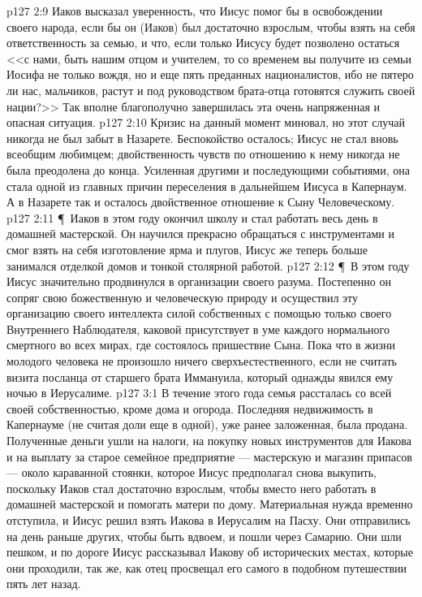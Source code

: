 \vs p127 2:9 Иаков высказал уверенность, что Иисус помог бы в освобождении своего народа, если бы он (Иаков) был достаточно взрослым, чтобы взять на себя ответственность за семью, и что, если только Иисусу будет позволено остаться <<с нами, быть нашим отцом и учителем, то со временем вы получите из семьи Иосифа не только вождя, но и еще пять преданных националистов, ибо не пятеро ли нас, мальчиков, растут и под руководством брата\hyp{}отца готовятся служить своей нации?>> Так вполне благополучно завершилась эта очень напряженная и опасная ситуация.
\vs p127 2:10 Кризис на данный момент миновал, но этот случай никогда не был забыт в Назарете. Беспокойство осталось; Иисус не стал вновь всеобщим любимцем; двойственность чувств по отношению к нему никогда не была преодолена до конца. Усиленная другими и последующими событиями, она стала одной из главных причин переселения в дальнейшем Иисуса в Капернаум. А в Назарете так и осталось двойственное отношение к Сыну Человеческому.
\vs p127 2:11 \P\ Иаков в этом году окончил школу и стал работать весь день в домашней мастерской. Он научился прекрасно обращаться с инструментами и смог взять на себя изготовление ярма и плугов, Иисус же теперь больше занимался отделкой домов и тонкой столярной работой.
\vs p127 2:12 \P\ В этом году Иисус значительно продвинулся в организации своего разума. Постепенно он сопряг свою божественную и человеческую природу и осуществил эту организацию своего интеллекта силой собственных  с помощью только своего Внутреннего Наблюдателя, каковой присутствует в уме каждого нормального смертного во всех мирах, где состоялось пришествие Сына. Пока что в жизни молодого человека не произошло ничего сверхъестественного, если не считать визита посланца от старшего брата Иммануила, который однажды явился ему ночью в Иерусалиме.
\vs p127 3:1 В течение этого года семья рассталась со всей своей собственностью, кроме дома и огорода. Последняя недвижимость в Капернауме (не считая доли еще в одной), уже ранее заложенная, была продана. Полученные деньги ушли на налоги, на покупку новых инструментов для Иакова и на выплату за старое семейное предприятие --- мастерскую и магазин припасов --- около караванной стоянки, которое Иисус предполагал снова выкупить, поскольку Иаков стал достаточно взрослым, чтобы вместо него работать в домашней мастерской и помогать матери по дому. Материальная нужда временно отступила, и Иисус решил взять Иакова в Иерусалим на Пасху. Они отправились на день раньше других, чтобы быть вдвоем, и пошли через Самарию. Они шли пешком, и по дороге Иисус рассказывал Иакову об исторических местах, которые они проходили, так же, как отец просвещал его самого в подобном путешествии пять лет назад.
